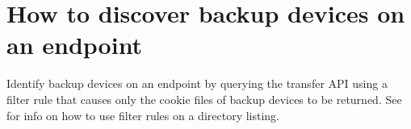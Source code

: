 
\section{How to discover backup devices on an endpoint\label{appendix:identifybackupdevices}}

Identify backup devices on an endpoint by querying the transfer API
using a filter rule that causes only the cookie files of backup devices
to be returned. See  for info
on how to use filter rules on a directory listing.

